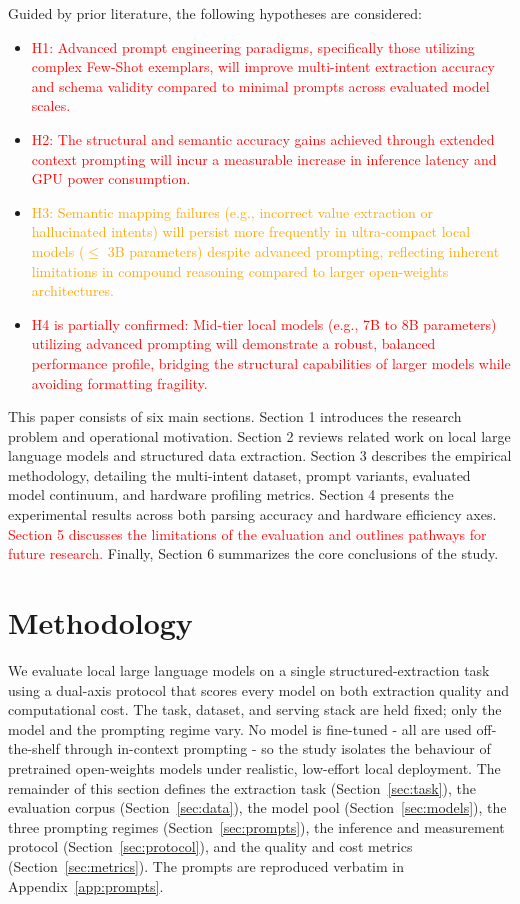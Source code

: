 \documentclass[journal,article,submit,pdftex,moreauthors]{Definitions/mdpi}
\begin{document}
Guided by prior literature, the following hypotheses are considered:

\begin{itemize}
    \item \textcolor{red}{H1: Advanced prompt engineering paradigms, specifically those utilizing complex Few-Shot exemplars, will improve multi-intent extraction accuracy and schema validity compared to minimal prompts across evaluated model scales.}
    \item \textcolor{red}{H2: The structural and semantic accuracy gains achieved through extended context prompting will incur a measurable increase in inference latency and GPU power consumption.}
    \item \textcolor{orange}{H3: Semantic mapping failures (e.g., incorrect value extraction or hallucinated intents) will persist more frequently in ultra-compact local models ($\le$ 3B parameters) despite advanced prompting, reflecting inherent limitations in compound reasoning compared to larger open-weights architectures.}
    \item \textcolor{red}{H4 is partially confirmed: Mid-tier local models (e.g., 7B to 8B parameters) utilizing advanced prompting will demonstrate a robust, balanced performance profile, bridging the structural capabilities of larger models while avoiding formatting fragility.}
\end{itemize}

This paper consists of six main sections. Section 1 introduces the research problem and operational motivation. Section 2 reviews related work on local large language models and structured data extraction. Section 3 describes the empirical methodology, detailing the multi-intent dataset, prompt variants, evaluated model continuum, and hardware profiling metrics. Section 4 presents the experimental results across both parsing accuracy and hardware efficiency axes. \textcolor{red}{Section 5 discusses the limitations of the evaluation and outlines pathways for future research.} Finally, Section 6 summarizes the core conclusions of the study.

\section{Methodology}

We evaluate local large language models on a single structured-extraction task using a dual-axis protocol that scores every model on both extraction quality and computational cost. The task, dataset, and serving stack are held fixed; only the model and the prompting regime vary. No model is fine-tuned - all are used off-the-shelf through in-context prompting - so the study isolates the behaviour of pretrained open-weights models under realistic, low-effort local deployment. The remainder of this section defines the extraction task (Section~\ref{sec:task}), the evaluation corpus (Section~\ref{sec:data}), the model pool (Section~\ref{sec:models}), the three prompting regimes (Section~\ref{sec:prompts}), the inference and measurement protocol (Section~\ref{sec:protocol}), and the quality and cost metrics (Section~\ref{sec:metrics}). The prompts are reproduced verbatim in Appendix~\ref{app:prompts}.
\end{document}
